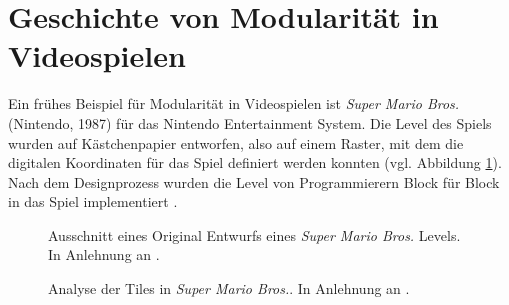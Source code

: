 \section{Geschichte von Modularität in Videospielen}\label{Geschichte von Modularität }
Ein frühes Beispiel für Modularität in Videospielen ist \textit{Super Mario Bros.} (Nintendo, 1987) für das Nintendo Entertainment System. Die Level des Spiels wurden auf Kästchenpapier entworfen, also auf einem Raster, mit dem die digitalen Koordinaten für das Spiel definiert werden konnten (vgl. Abbildung \ref{marioAnalog}). Nach dem Designprozess wurden die Level von Programmierern Block für Block in das Spiel implementiert \parencite{marioAnalog}.\enlargethispage{10.5pt}
\begin{figure}[H]
\centering
  \caption{Ausschnitt eines Original Entwurfs eines \textit{Super Mario Bros.} Levels. In Anlehnung an \parencite{marioAnalog}.}
\label{marioAnalog}
\end{figure}
\vspace{-14pt}
\enlargethispage{10.5pt}
\begin{figure}[H]
\centering
  \caption{Analyse der Tiles in \textit{Super Mario Bros.}. In Anlehnung an \parencite{MarioTiles}.}
\label{MarioImage}
\end{figure}
